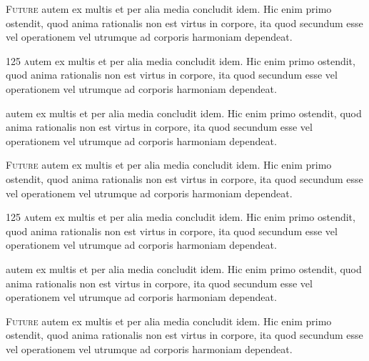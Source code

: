 \lettrine{}{Future}
autem ex multis et per alia media concludit idem. Hic enim primo ostendit, quod anima rationalis 
non est virtus in corpore, ita quod secundum esse vel
operationem vel utrumque ad corporis harmoniam dependeat.

\lettrine{125 }
autem ex multis et per alia media concludit idem. Hic enim primo ostendit, quod anima rationalis 
non est virtus in corpore, ita quod secundum esse vel
operationem vel utrumque ad corporis harmoniam dependeat.

\lettrine{}{}
autem ex multis et per alia media concludit idem. Hic enim primo ostendit, quod anima rationalis 
non est virtus in corpore, ita quod secundum esse vel
operationem vel utrumque ad corporis harmoniam dependeat.

\lettrine{}{Future}
autem ex multis et per alia media concludit idem. Hic enim primo ostendit, quod anima rationalis 
non est virtus in corpore, ita quod secundum esse vel
operationem vel utrumque ad corporis harmoniam dependeat.

\lettrine{125 }
autem ex multis et per alia media concludit idem. Hic enim primo ostendit, quod anima rationalis 
non est virtus in corpore, ita quod secundum esse vel
operationem vel utrumque ad corporis harmoniam dependeat.

\lettrine{}{}
autem ex multis et per alia media concludit idem. Hic enim primo ostendit, quod anima rationalis 
non est virtus in corpore, ita quod secundum esse vel
operationem vel utrumque ad corporis harmoniam dependeat.

\lettrine{}{Future}
autem ex multis et per alia media concludit idem. Hic enim primo ostendit, quod anima rationalis 
non est virtus in corpore, ita quod secundum esse vel
operationem vel utrumque ad corporis harmoniam dependeat.

